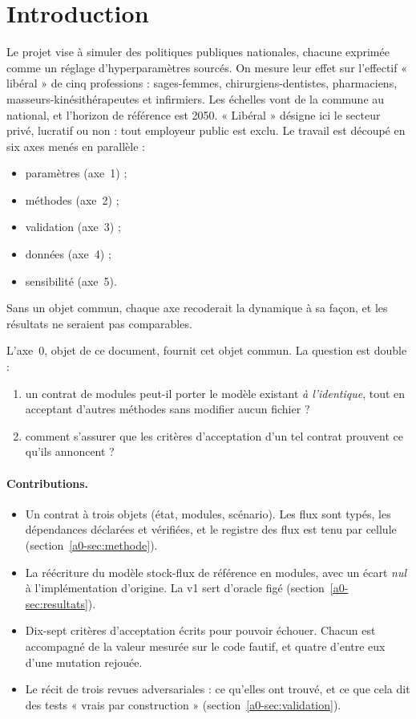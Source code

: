\section{Introduction}

Le projet vise à simuler des politiques publiques nationales, chacune exprimée comme un réglage
d'hyperparamètres sourcés. On mesure leur effet sur l'effectif « libéral » de cinq professions :
sages-femmes, chirurgiens-dentistes, pharmaciens, masseurs-kinésithérapeutes et infirmiers. Les
échelles vont de la commune au national, et l'horizon de référence est 2050. « Libéral » désigne ici
le secteur privé, lucratif ou non : tout employeur public est exclu. Le travail est découpé en six axes
menés en parallèle :
\begin{itemize}
  \item paramètres (axe~1) ;
  \item méthodes (axe~2) ;
  \item validation (axe~3) ;
  \item données (axe~4) ;
  \item sensibilité (axe~5).
\end{itemize}
Sans un objet commun, chaque axe recoderait la dynamique à sa façon, et les résultats ne seraient
pas comparables.

L'axe~0, objet de ce document, fournit cet objet commun. La question est double :
\begin{enumerate}
  \item un contrat de modules peut-il porter le modèle existant \emph{à l'identique}, tout en
        acceptant d'autres méthodes sans modifier aucun fichier ?
  \item comment s'assurer que les critères d'acceptation d'un tel contrat prouvent ce qu'ils
        annoncent ?
\end{enumerate}

\paragraph{Contributions.}
\begin{itemize}
  \item Un contrat à trois objets (état, modules, scénario). Les flux sont typés, les dépendances
        déclarées et vérifiées, et le registre des flux est tenu par cellule (section~\ref{a0-sec:methode}).
  \item La réécriture du modèle stock-flux de référence en modules, avec un écart \emph{nul} à
        l'implémentation d'origine. La v1 sert d'oracle figé (section~\ref{a0-sec:resultats}).
  \item Dix-sept critères d'acceptation écrits pour pouvoir échouer. Chacun est accompagné de la valeur
        mesurée sur le code fautif, et quatre d'entre eux d'une mutation rejouée.
  \item Le récit de trois revues adversariales : ce qu'elles ont trouvé, et ce que cela dit des tests
        « vrais par construction » (section~\ref{a0-sec:validation}).
\end{itemize}

